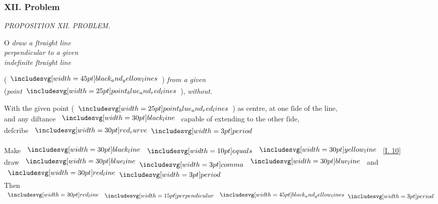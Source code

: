 \documentclass[11pt,preview]{standalone}
\begin{document}
\subsubsection{XII. Problem}

\begin{minipage}[t]{0.43\textwidth}
    \vspace{20pt}
    
\end{minipage}%
\hfill
\begin{minipage}[t]{0.54\textwidth}
    \begin{center}
        \textit{PROPOSITION XII. PROBLEM.}\label{book1pr12} \\
    \end{center}

    \hfill

    \begin{center}
        \raggedright \lettrine[lines=3, loversize=1, nindent=0pt]{}{}O \textit{draw a ſtraight line\\ perpendicular to a given\\ indefinite ſtraight line}
    \end{center}
    (\hspace{-1ex}$\bimg{black_and_yellow_lines}$\hspace{-1ex}) \textit{from a given}\\ (\textit{point}$\img{point_blue_and_red_lines}$\hspace{-1ex}), \textit{without}.
\end{minipage}

\hfill

\begin{center}
    With the given point (\hspace{-1ex}$\img{point_blue_and_red_lines}$\hspace{-1ex}) as centre, at one ſide of the line,\\
    and any diſtance $\blackline$ capable of extending to the other ſide,\\ deſcribe $\img[0][0][30]{red_curve} \bperiod$\\
    \hfill\\
    Make $\blackline \bequals \yellowline$ [\hyperref[book1pr10]{\textsc{I.} 10}]\\
    draw $\blueline \bcomma \blueline$ and $\redline \bperiod$\\
    Then $\redline \bperp \bimg{black_and_yellow_lines} \bperiod$
\end{center}
\end{document}
